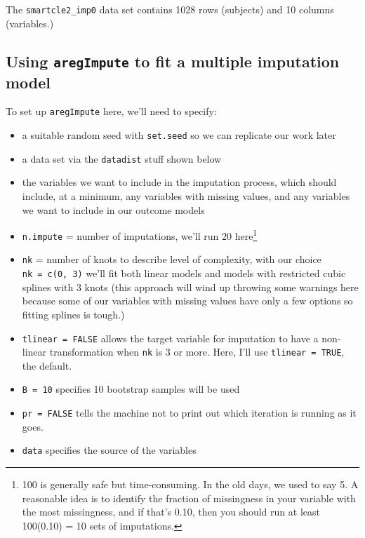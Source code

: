 \documentclass[]{book}
\providecommand{\tightlist}{%
  \setlength{\itemsep}{0pt}\setlength{\parskip}{0pt}}
\let\rmarkdownfootnote\footnote%
\def\footnote{\protect\rmarkdownfootnote}
\theoremstyle{definition}
\theoremstyle{definition}
\theoremstyle{definition}
\theoremstyle{remark}
\begin{document}
The \texttt{smartcle2\_imp0} data set contains 1028 rows (subjects) and
10 columns (variables.)

\subsection{\texorpdfstring{Using \texttt{aregImpute} to fit a multiple
imputation
model}{Using aregImpute to fit a multiple imputation model}}\label{using-aregimpute-to-fit-a-multiple-imputation-model-1}

To set up \texttt{aregImpute} here, we'll need to specify:

\begin{itemize}
\tightlist
\item
  a suitable random seed with \texttt{set.seed} so we can replicate our
  work later
\item
  a data set via the \texttt{datadist} stuff shown below
\item
  the variables we want to include in the imputation process, which
  should include, at a minimum, any variables with missing values, and
  any variables we want to include in our outcome models
\item
  \texttt{n.impute} = number of imputations, we'll run 20 here\footnote{100
    is generally safe but time-consuming. In the old days, we used to
    say 5. A reasonable idea is to identify the fraction of missingness
    in your variable with the most missingness, and if that's 0.10, then
    you should run at least 100(0.10) = 10 sets of imputations.}
\item
  \texttt{nk} = number of knots to describe level of complexity, with
  our choice \texttt{nk\ =\ c(0,\ 3)} we'll fit both linear models and
  models with restricted cubic splines with 3 knots (this approach will
  wind up throwing some warnings here because some of our variables with
  missing values have only a few options so fitting splines is tough.)
\item
  \texttt{tlinear\ =\ FALSE} allows the target variable for imputation
  to have a non-linear transformation when \texttt{nk} is 3 or more.
  Here, I'll use \texttt{tlinear\ =\ TRUE}, the default.
\item
  \texttt{B\ =\ 10} specifies 10 bootstrap samples will be used
\item
  \texttt{pr\ =\ FALSE} tells the machine not to print out which
  iteration is running as it goes.
\item
  \texttt{data} specifies the source of the variables
\end{itemize}
\end{document}
